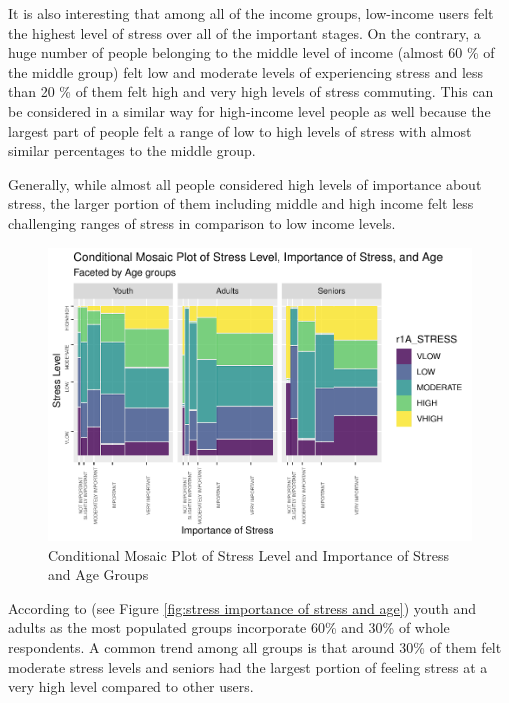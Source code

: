 \documentclass[
11pt, %
oneside, %
english, %
singlespacing, %
]{macthesis} %
\begin{document}
It is also interesting that among all of the income groups, low-income users felt the highest level of stress over all of the important stages. On the contrary, a huge number of people belonging to the middle level of income (almost 60 \% of the middle group) felt low and moderate levels of experiencing stress and less than 20 \% of them felt high and very high levels of stress commuting. This can be considered in a similar way for high-income level people as well because the largest part of people felt a range of low to high levels of stress with almost similar percentages to the middle group.

Generally, while almost all people considered high levels of importance about stress, the larger portion of them including middle and high income felt less challenging ranges of stress in comparison to low income levels.
\begin{figure}
\includegraphics[width=0.85\linewidth]{thesis_files/figure-latex/unnamed-chunk-27-1} \caption{\label{fig:stress importance of stress and age}Conditional Mosaic Plot of Stress Level and Importance of Stress and Age Groups}\label{fig:unnamed-chunk-27}
\end{figure}
According to (see Figure \ref{fig:stress importance of stress and age}) youth and adults as the most populated groups incorporate 60\% and 30\% of whole respondents. A common trend among all groups is that around 30\% of them felt moderate stress levels and seniors had the largest portion of feeling stress at a very high level compared to other users.
\end{document}
